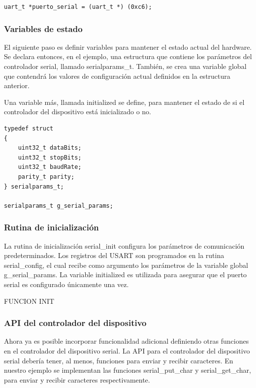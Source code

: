 \documentclass[12pt]{article}
\begin{document}
\begin{verbatim}
uart_t *puerto_serial = (uart_t *) (0xc6);
\end{verbatim}


\subsubsection *{Variables de estado}

El siguiente paso es definir variables para mantener el estado actual
del hardware. Se declara entonces, en el ejemplo, una estructura
que contiene los parámetros del controlador serial, llamado serialparams\_t.
También, se crea una variable global que contendrá los valores 
de configuración actual definidos en la estructura anterior.

Una variable más, llamada initialized se define, para mantener el estado 
de si el 
controlador del dispositivo está inicializado o no.

\begin{verbatim}
typedef struct
{
    uint32_t dataBits;
    uint32_t stopBits;
    uint32_t baudRate;
    parity_t parity;
} serialparams_t;

serialparams_t g_serial_params;
\end{verbatim}


\subsubsection *{Rutina de inicialización}

La rutina de inicialización serial\_init configura los parámetros de comunicación
predeterminados.
Los registros del USART son programados en la rutina serial\_config, el
cual recibe como argumento los parámetros de la variable global g\_serial\_params.
La variable initialized es utilizada para asegurar que el puerto
serial es configurado únicamente una vez.


FUNCION INIT


\subsubsection *{API del controlador del dispositivo}


Ahora ya es posible incorporar funcionalidad adicional definiendo otras
funciones en el controlador del dispositivo serial.
La API para el controlador del dispositivo serial debería tener, al menos,
funciones para enviar y recibir caracteres. En nuestro ejemplo
se implementan las funciones serial\_put\_char y serial\_get\_char, 
para enviar y recibir caracteres respectivamente.
\end{document}
